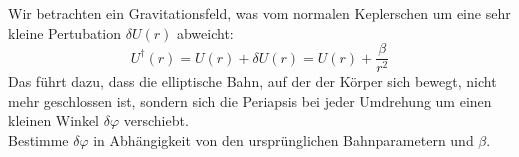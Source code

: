 \begin{Exercise}[label = viralthe, title = Periheldrehung, difficulty = 5, origin = Aaron Wild]
	Wir betrachten ein Gravitationsfeld, was vom normalen Keplerschen um eine sehr kleine Pertubation $\delta U\left(r\right)$ abweicht:
	\begin{equation}
		U^\dagger\left(r\right) = U\left(r\right) + \delta U\left(r\right) = U\left(r\right)+\frac{\beta}{r^2}
	\end{equation}
	Das führt dazu, dass die elliptische Bahn, auf der der Körper sich bewegt, nicht mehr geschlossen ist, sondern sich die Periapsis bei jeder Umdrehung um einen kleinen Winkel $\delta \varphi$ verschiebt. \\
	Bestimme $\delta \varphi$ in Abhängigkeit von den ursprünglichen Bahnparametern und $\beta$. 
	
\end{Exercise}

